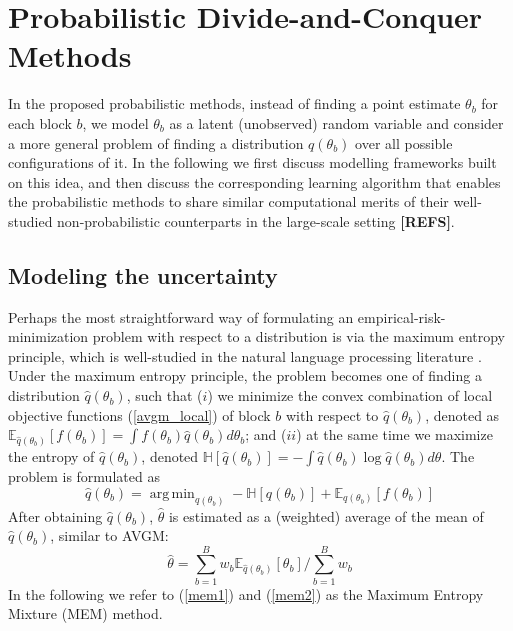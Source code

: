 \documentclass{article}
\DeclareMathOperator*{\argmin}{arg\,min}
\newcommand{\1}[0]{\ensuremath{\boldsymbol{1}}\xspace}
\begin{document}
\section{Probabilistic Divide-and-Conquer Methods}\label{proposed_frameworks}


In the proposed probabilistic methods, instead of finding a point estimate $\theta_b$ for each block $b$, we model $\theta_b$ as a latent (unobserved) random variable and consider a more general problem of finding a distribution $q(\theta_b)$ over all possible configurations of it. In the following we first discuss modelling frameworks built on this idea, and then discuss the corresponding learning algorithm that enables the probabilistic methods to share similar computational merits of their well-studied non-probabilistic counterparts in the large-scale setting \textbf{[REFS]}.


\subsection{Modeling the uncertainty}\label{MEM}

Perhaps the most straightforward way of formulating an empirical-risk-minimization problem with respect to a distribution is via the maximum entropy principle, which is well-studied in the natural language processing literature \cite{Berger1996}. Under the maximum entropy principle, the problem becomes one of finding a distribution $\hat q(\theta_b)$, such that ($i$) we minimize the convex combination of local objective functions (\ref{avgm_local}) of block $b$ with respect to $\hat q(\theta_b)$, denoted as $\mathbb{E}_{\hat q(\theta_b)}[f(\theta_b)] = \int f(\theta_b)\hat q(\theta_b) d\theta_b$; and ($ii$) at the same time we maximize the entropy of $\hat q(\theta_b)$, denoted $\mathbb{H}[\hat q(\theta_b)] = -\int \hat q(\theta_b)\log  \hat q(\theta_b) d\theta$. The problem is formulated as
\begin{equation}\label{mem1}
\textstyle\hat q(\theta_b) =\argmin_{q(\theta_b)} -\mathbb{H}[q(\theta_b)] +  \mathbb{E}_{q(\theta_b) }[f(\theta_b)]
\end{equation}
After obtaining $\hat q(\theta_b)$, $\hat\theta$ is estimated as a (weighted) average of the mean of $\hat q(\theta_b)$, similar to AVGM: 
\begin{equation}\label{mem2}
\hat\theta = \textstyle\sum_{b=1}^Bw_b\mathbb{E}_{\hat q(\theta_b) }[\theta_b]/\sum_{b=1}^Bw_b
\end{equation}
In the following we refer to (\ref{mem1}) and (\ref{mem2}) as the Maximum Entropy Mixture (MEM) method. 
\end{document}
